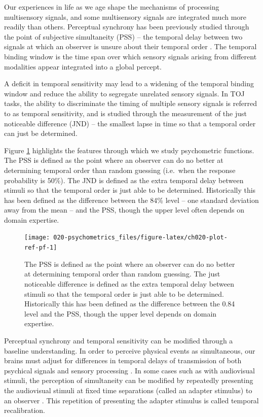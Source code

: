 \documentclass[11pt, oneside, openany]{scrbook}
\begin{document}
Our experiences in life as we age shape the mechanisms of processing multisensory signals, and some multisensory signals are integrated much more readily than others. Perceptual synchrony has been previously studied through the point of subjective simultaneity (PSS) -- the temporal delay between two signals at which an observer is unsure about their temporal order \citep{stone2001now}. The temporal binding window is the time span over which sensory signals arising from different modalities appear integrated into a global percept.

A deficit in temporal sensitivity may lead to a widening of the temporal binding window and reduce the ability to segregate unrelated sensory signals. In TOJ tasks, the ability to discriminate the timing of multiple sensory signals is referred to as temporal sensitivity, and is studied through the measurement of the just noticeable difference (JND) -- the smallest lapse in time so that a temporal order can just be determined.

Figure \ref{fig:ch020-plot-ref-pf} highlights the features through which we study psychometric functions. The PSS is defined as the point where an observer can do no better at determining temporal order than random guessing (i.e.~when the response probability is 50\%). The JND is defined as the extra temporal delay between stimuli so that the temporal order is just able to be determined. Historically this has been defined as the difference between the 84\% level -- one standard deviation away from the mean -- and the PSS, though the upper level often depends on domain expertise.

\begin{figure}

{\centering \texttt{[image: 020-psychometrics\_files/figure-latex/ch020-plot-ref-pf-1]} 

}

\caption{The PSS is defined as the point where an observer can do no better at determining temporal order than random guessing. The just noticeable difference is defined as the extra temporal delay between stimuli so that the temporal order is just able to be determined. Historically this has been defined as the difference between the 0.84 level and the PSS, though the upper level depends on domain expertise.}\label{fig:ch020-plot-ref-pf}
\end{figure}

Perceptual synchrony and temporal sensitivity can be modified through a baseline understanding. In order to perceive physical events as simultaneous, our brains must adjust for differences in temporal delays of transmission of both psychical signals and sensory processing \citep{fujisaki2004recalibration}. In some cases such as with audiovisual stimuli, the perception of simultaneity can be modified by repeatedly presenting the audiovisual stimuli at fixed time separations (called an adapter stimulus) to an observer \citep{vroomen2004recalibration}. This repetition of presenting the adapter stimulus is called temporal recalibration.
\end{document}
